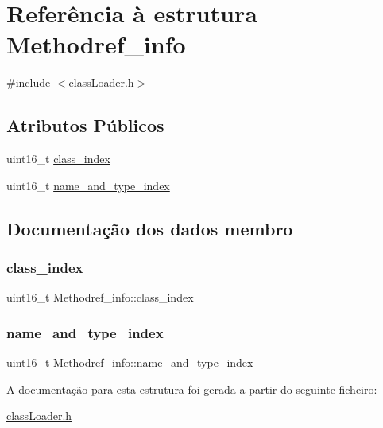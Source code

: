 \hypertarget{struct_methodref__info}{}\section{Referência à estrutura Methodref\+\_\+info}
\label{struct_methodref__info}


{\ttfamily \#include $<$class\+Loader.\+h$>$}

\subsection*{Atributos Públicos}
\begin{DoxyCompactItemize}
\item 
uint16\+\_\+t \hyperlink{struct_methodref__info_a7ac7eeb14fca2516199462c7d2ffc16c}{class\+\_\+index}
\item 
uint16\+\_\+t \hyperlink{struct_methodref__info_a88fef59eaf724bd31be47274f83e8ec5}{name\+\_\+and\+\_\+type\+\_\+index}
\end{DoxyCompactItemize}


\subsection{Documentação dos dados membro}
\hypertarget{struct_methodref__info_a7ac7eeb14fca2516199462c7d2ffc16c}{}\label{struct_methodref__info_a7ac7eeb14fca2516199462c7d2ffc16c} 
\subsubsection{\texorpdfstring{class\+\_\+index}{class\_index}}
{\footnotesize\ttfamily uint16\+\_\+t Methodref\+\_\+info\+::class\+\_\+index}

\hypertarget{struct_methodref__info_a88fef59eaf724bd31be47274f83e8ec5}{}\label{struct_methodref__info_a88fef59eaf724bd31be47274f83e8ec5} 
\subsubsection{\texorpdfstring{name\+\_\+and\+\_\+type\+\_\+index}{name\_and\_type\_index}}
{\footnotesize\ttfamily uint16\+\_\+t Methodref\+\_\+info\+::name\+\_\+and\+\_\+type\+\_\+index}



A documentação para esta estrutura foi gerada a partir do seguinte ficheiro\+:\begin{DoxyCompactItemize}
\item 
\hyperlink{class_loader_8h}{class\+Loader.\+h}\end{DoxyCompactItemize}
